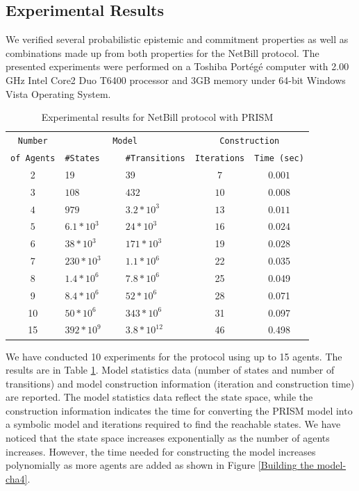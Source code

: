\subsection{Experimental Results}\label{sec:Experimental-results-cha4}

We verified several probabilistic epistemic and commitment
properties as well as combinations made up from both properties
for the NetBill protocol. The presented experiments were
performed on a Toshiba Port\'{e}g\'{e} computer
with 2.00 GHz Intel Core2 Duo T6400 processor and 3GB memory under
64-bit Windows Vista Operating System.


\begin{table} %
\centering \caption{Experimental results for NetBill protocol with
PRISM} \label{tab:result-cha4}
\begin{tabular}{|c|l|l|c|c|}
    \hline
    \texttt{Number}& \multicolumn{2}{c|}{\texttt{Model}} & \multicolumn{2}{c|}{\texttt{Construction}}\\
    \cline{2-5}
    \texttt{of Agents}  & \texttt{\#States} & \ \ \ \texttt{\#Transitions} & \texttt{Iterations} & \texttt{Time (sec)} \\
    \cline{1-5}
    \hline
    \hline
    2 &  19 & \ \ \ 39 & $7$ & $0.001$\\
    \hline
    $3$ &  $108$ & \ \ \ $432$ & $10$ & $0.008$\\
    \hline
    $4$ &  $979$ & \ \ \ $3.2*10^3$ & $13$ & $0.011$\\
    \hline
    $5$ &   $6.1*10^3$ & \ \ \ $24*10^3$ & $16$ & $0.024$\\
    \hline
    6 &  $38*10^3$ & \ \ \ $171*10^3$ & 19 & 0.028\\
    \hline
    7 &   $230*10^3$ & \ \ \ $1.1*10^6$ & 22 & 0.035\\
    \hline
    8 &   $1.4*10^6$ & \ \ \ $7.8*10^6$ & 25 & 0.049\\
    \hline
    9 &   $8.4*10^6$ & \ \ \ $52*10^6$ & 28 & 0.071\\
    \hline
    10 &  $50*10^6$ & \ \ \ $343*10^6$    & 31 & 0.097\\
    \hline
    15 & $392*10^9$ & \ \ \ $3.8*10^{12}$ & 46 & 0.498\\
    \hline
\end{tabular}
\end{table}

We have conducted 10 experiments for the protocol using up to 15
agents. The results are in Table \ref{tab:result-cha4}. Model
statistics data (number of states and number of transitions) and
model construction information (iteration and construction time)
are reported. The model statistics data reflect the state space,
while the construction information indicates the time for
converting the PRISM model into a symbolic model and iterations required to find the reachable states. We have noticed that the state space increases
exponentially as the number of agents increases. However, the time
needed for constructing the model increases polynomially as more
agents are added as shown in Figure \ref{Building the model-cha4}.


